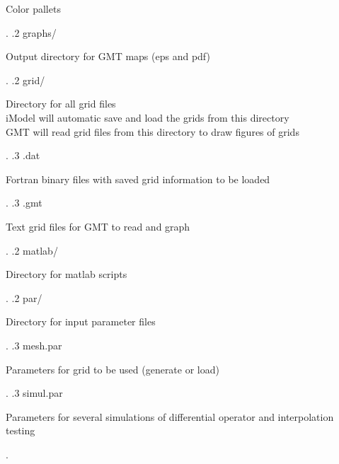 \documentclass[a4paper,10pt]{article}
\begin{document}
{\begin{minipage}[t]{10cm}
	    Color pallets \\
          \end{minipage}.
.2 graphs/ \hspace{1cm}  \begin{minipage}[t]{10cm}
          Output directory for GMT maps (eps and pdf)\\
          \end{minipage}.
.2 grid/ \hspace{1cm}  \begin{minipage}[t]{10cm}
          Directory for all grid files\\
	  iModel will automatic save and load the grids from this directory\\
	  GMT will read grid files from this directory to draw figures of grids\\
          \end{minipage}.
.3 {.}dat \hspace{1cm}  \begin{minipage}[t]{10cm}
          Fortran binary files with saved grid information to be loaded\\
	  \end{minipage}.
.3 {.gmt} \hspace{1cm}  \begin{minipage}[t]{10cm}
	    Text grid files for GMT to read and graph\\
          \end{minipage}.
.2 matlab/ \hspace{1cm}  \begin{minipage}[t]{10cm}
          Directory for matlab scripts\\
          \end{minipage}.
.2 par/ \hspace{1cm}  \begin{minipage}[t]{10cm}
          Directory for input parameter files
          \end{minipage}.
.3 mesh{.}par \hspace{1cm}  \begin{minipage}[t]{10cm}
          Parameters for grid to be used (generate or load)\\
	  \end{minipage}.
.3 simul{.}par \hspace{1cm}  \begin{minipage}[t]{10cm}
	    Parameters for several simulations of differential operator and interpolation testing\\
          \end{minipage}.
}
\end{document}
